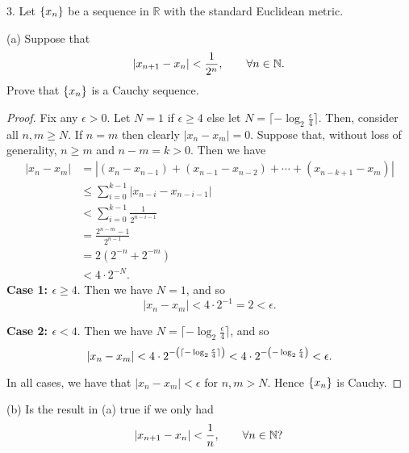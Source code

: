 \documentclass{article}
\newcommand{\N}{\mathbb{N}}
\newcommand{\R}{\mathbb{R}}
\begin{document}
\newpage

3. Let $\cbr{x_n}$ be a sequence in $\R$ with the standard Euclidean metric.

(a) Suppose that
%
\begin{equation*}
    \envert{x_{n+1} - x_n} < \frac{1}{2^n}, \qquad \forall n \in \N
    .
\end{equation*}
%
Prove that $\cbr{x_n}$ is a Cauchy sequence.

\begin{proof}

Fix any $\epsilon > 0$. Let $N = 1$ if $\epsilon \geq 4$ else let $N =
\lceil - \log_2 \frac{\epsilon}{4} \rceil$. Then, consider all $n, m
\geq N$. If $n = m$ then clearly $|x_n - x_m| = 0$. Suppose that,
without loss of generality, $n \geq m$ and $n - m = k > 0$. Then we have
%
\begin{align*}
    |x_n - x_m|
        &= |(x_n - x_{n - 1}) + (x_{n - 1} - x_{n - 2}) + \cdots + (x_{n - k + 1} - x_m)| \\
        &\leq \sum_{i = 0}^{k - 1} |x_{n - i} - x_{n - i - 1}| \\
        &< \sum_{i = 0}^{k - 1} \frac{1}{2^{n - i - 1}} \\
        &= \frac{2^{n - m} - 1}{2^{n - 1}} \\
        &= 2 (2^{-n} + 2^{-m}) \\
        &< 4 \cdot 2^{-N}
        .
\end{align*}
%
\textbf{Case 1: $\epsilon \geq 4$}. Then we have $N = 1$, and so
%
\begin{equation*}
    |x_n - x_m| < 4 \cdot 2^{-1} = 2 < \epsilon
        .
\end{equation*}

\textbf{Case 2: $\epsilon < 4$}. Then we have $N = \lceil - \log_2
\frac{\epsilon}{4} \rceil$, and so
%
\begin{equation*}
    |x_n - x_m|
        < 4 \cdot 2^{- \del{\lceil - \log_2 \frac{\epsilon}{4} \rceil}}
        < 4 \cdot 2^{- \del{- \log_2 \frac{\epsilon}{4}}}
        < \epsilon
        .
\end{equation*}

In all cases, we have that $|x_n - x_m| < \epsilon$ for $n, m > N$.
Hence $\cbr{x_n}$ is Cauchy.

\end{proof}

\newpage

(b) Is the result in (a) true if we only had
%
\begin{equation*}
    \envert{x_{n+1} - x_n} < \frac{1}{n}, \qquad \forall n \in \N
    ?
\end{equation*}
\end{document}

